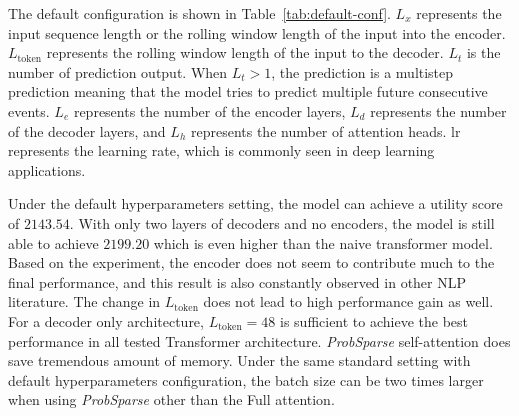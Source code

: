 \documentclass{article} %
\begin{document}
The default configuration is shown in Table~\ref{tab:default-conf}.
$L_{x}$ represents the input sequence length or the rolling window length of the input into the encoder.
$L_{\mathrm{token}}$ represents the rolling window length of the input to the decoder.
$L_{t}$ is the number of prediction output.
When $L_{t} > 1$, the prediction is a multistep prediction meaning that the model tries to predict multiple future consecutive events.
$L_{e}$ represents the number of the encoder layers, $L_{d}$ represents the number of the decoder layers, and $L_{h}$ represents the number of attention heads.
lr represents the learning rate, which is commonly seen in deep learning applications.

Under the default hyperparameters setting, the model can achieve a utility score of $2143.54$.
With only two layers of decoders and no encoders, the model is still able to achieve $2199.20$ which is even higher than the naive transformer model.
Based on the experiment, the encoder does not seem to contribute much to the final performance, and this result is also constantly observed in other NLP literature.
The change in $L_{\mathrm{token}}$ does not lead to high performance gain as well.
For a decoder only architecture, $L_{\mathrm{token}} = 48$ is sufficient to achieve the best performance in all tested Transformer architecture.
\textit{ProbSparse} self-attention does save tremendous amount of memory.
Under the same standard setting with default hyperparameters configuration, the batch size can be two times larger when using \textit{ProbSparse} other than the Full attention.

\begin{table}[ht]
\centering
{}
\caption{Default Hyperparameters}\label{tab:default-conf}
\end{table}
\end{document}
